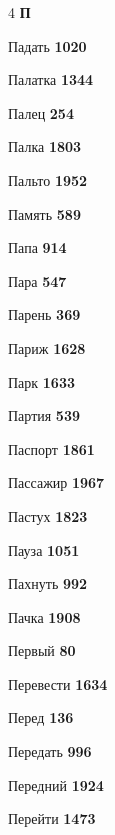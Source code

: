 \begin{multicols}{4}
\vspace{0.6em}\noindent\textbf{\normalsize\sffamily\color{primary} П}\par\vspace{0.2em}
\noindent Падать \dotfill \textbf{\color{secondary} 1020}\par
\noindent Палатка \dotfill \textbf{\color{secondary} 1344}\par
\noindent Палец \dotfill \textbf{\color{secondary} 254}\par
\noindent Палка \dotfill \textbf{\color{secondary} 1803}\par
\noindent Пальто \dotfill \textbf{\color{secondary} 1952}\par
\noindent Память \dotfill \textbf{\color{secondary} 589}\par
\noindent Папа \dotfill \textbf{\color{secondary} 914}\par
\noindent Пара \dotfill \textbf{\color{secondary} 547}\par
\noindent Парень \dotfill \textbf{\color{secondary} 369}\par
\noindent Париж \dotfill \textbf{\color{secondary} 1628}\par
\noindent Парк \dotfill \textbf{\color{secondary} 1633}\par
\noindent Партия \dotfill \textbf{\color{secondary} 539}\par
\noindent Паспорт \dotfill \textbf{\color{secondary} 1861}\par
\noindent Пассажир \dotfill \textbf{\color{secondary} 1967}\par
\noindent Пастух \dotfill \textbf{\color{secondary} 1823}\par
\noindent Пауза \dotfill \textbf{\color{secondary} 1051}\par
\noindent Пахнуть \dotfill \textbf{\color{secondary} 992}\par
\noindent Пачка \dotfill \textbf{\color{secondary} 1908}\par
\noindent Первый \dotfill \textbf{\color{secondary} 80}\par
\noindent Перевести \dotfill \textbf{\color{secondary} 1634}\par
\noindent Перед \dotfill \textbf{\color{secondary} 136}\par
\noindent Передать \dotfill \textbf{\color{secondary} 996}\par
\noindent Передний \dotfill \textbf{\color{secondary} 1924}\par
\noindent Перейти \dotfill \textbf{\color{secondary} 1473}\par

\end{multicols}
